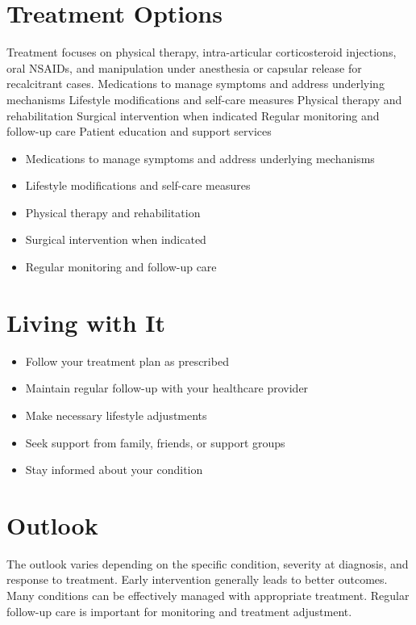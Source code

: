 \section{Treatment Options}
Treatment focuses on physical therapy, intra-articular corticosteroid injections, oral NSAIDs, and manipulation under anesthesia or capsular release for recalcitrant cases. Medications to manage symptoms and address underlying mechanisms Lifestyle modifications and self-care measures Physical therapy and rehabilitation Surgical intervention when indicated Regular monitoring and follow-up care Patient education and support services

\begin{itemize}[noitemsep]
  \item Medications to manage symptoms and address underlying mechanisms
  \item Lifestyle modifications and self-care measures
  \item Physical therapy and rehabilitation
  \item Surgical intervention when indicated
  \item Regular monitoring and follow-up care
\end{itemize}
\section{Living with It}
\begin{itemize}[noitemsep]
  \item Follow your treatment plan as prescribed
  \item Maintain regular follow-up with your healthcare provider
  \item Make necessary lifestyle adjustments
  \item Seek support from family, friends, or support groups
  \item Stay informed about your condition
\end{itemize}
\section{Outlook}
The outlook varies depending on the specific condition, severity at diagnosis, and response to treatment. Early intervention generally leads to better outcomes. Many conditions can be effectively managed with appropriate treatment. Regular follow-up care is important for monitoring and treatment adjustment.
